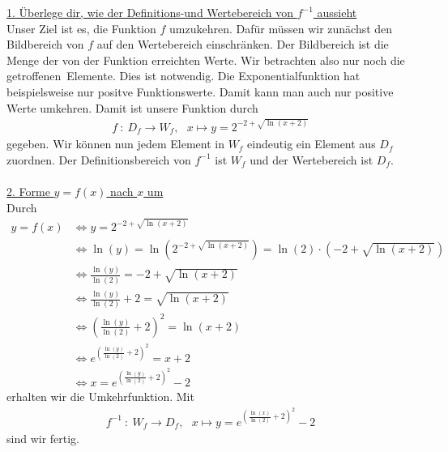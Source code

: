 \underline{1. Überlege dir, wie der Definitions-und Wertebereich von $f^{-1}$ aussieht}\\
Unser Ziel ist es, die Funktion $f$ umzukehren.
Dafür müssen wir zunächst den Bildbereich von $f$ auf den Wertebereich einschränken.
Der Bildbereich ist die Menge der von der Funktion erreichten Werte.
Wir betrachten also nur noch die \glqq getroffenen\grqq~Elemente.
Dies ist notwendig. Die Exponentialfunktion hat beispielsweise nur positve Funktionswerte. Damit kann man auch nur positive Werte umkehren.  
Damit ist unsere Funktion durch
\begin{align*}
f \ : \ D_f \to W_f,\ \ \
x \mapsto y = 2^{-2 + \sqrt{\ln(x+2)}}
\end{align*}
gegeben.
Wir können nun jedem Element in $W_f$ eindeutig ein Element aus $D_f$ zuordnen.
Der Definitionsbereich von $f^{-1}$ ist $W_f$ und der Wertebereich ist $D_f$.\\
\\
\underline{2. Forme $y = f(x)$ nach $x$ um}\\
Durch 
\begin{align*}
y = f(x) 
&\Leftrightarrow
y = 2^{-2 + \sqrt{\ln(x+2)}}\\
&\Leftrightarrow
\ln(y) = \ln \left(2^{-2 + \sqrt{\ln(x+2)}} \right)
= \ln(2) \cdot (-2 + \sqrt{\ln(x+2)})\\
&\Leftrightarrow
\frac{\ln(y)}{\ln(2)} = -2 + \sqrt{\ln(x+2)}\\
&\Leftrightarrow
\frac{\ln(y)}{\ln(2)} +2 =  \sqrt{\ln(x+2)}\\
&\Leftrightarrow
\left(\frac{\ln(y)}{\ln(2)} +2 \right)^2 = \ln(x+2)\\
&\Leftrightarrow
e^{\left(\frac{\ln(y)}{\ln(2)} +2 \right)^2} = x+2 \\
&\Leftrightarrow
x = e^{\left(\frac{\ln(y)}{\ln(2)} +2 \right)^2} -2
\end{align*}
erhalten wir die Umkehrfunktion.
Mit
\begin{align*}
f^{-1} \ : \ W_f \to D_f, \ \ \
x \mapsto y = e^{\left(\frac{\ln(x)}{\ln(2)} +2 \right)^2} -2
\end{align*}
sind wir fertig.

